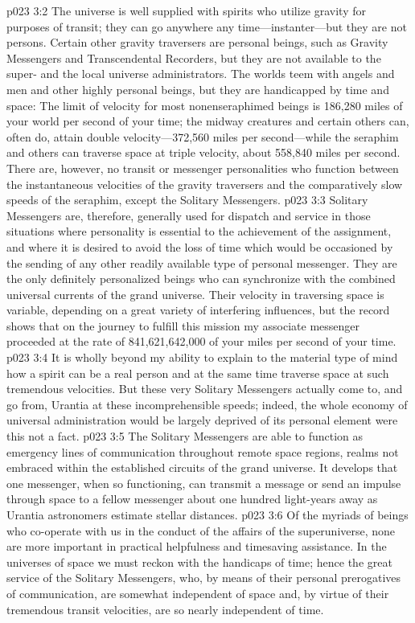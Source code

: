 \pc \vs p023 3:2 The universe is well supplied with spirits who utilize gravity for purposes of transit; they can go anywhere any time---instanter---but they are not persons. Certain other gravity traversers are personal beings, such as Gravity Messengers and Transcendental Recorders, but they are not available to the super\hyp{} and the local universe administrators. The worlds teem with angels and men and other highly personal beings, but they are handicapped by time and space: The limit of velocity for most nonenseraphimed beings is 186,280 miles of your world per second of your time; the midway creatures and certain others can, often do, attain double velocity---372,560 miles per second---while the seraphim and others can traverse space at triple velocity, about 558,840 miles per second. There are, however, no transit or messenger personalities who function between the instantaneous velocities of the gravity traversers and the comparatively slow speeds of the seraphim, except the Solitary Messengers.
\vs p023 3:3 Solitary Messengers are, therefore, generally used for dispatch and service in those situations where personality is essential to the achievement of the assignment, and where it is desired to avoid the loss of time which would be occasioned by the sending of any other readily available type of personal messenger. They are the only definitely personalized beings who can synchronize with the combined universal currents of the grand universe. Their velocity in traversing space is variable, depending on a great variety of interfering influences, but the record shows that on the journey to fulfill this mission my associate messenger proceeded at the rate of 841,621,642,000 of your miles per second of your time.
\vs p023 3:4 It is wholly beyond my ability to explain to the material type of mind how a spirit can be a real person and at the same time traverse space at such tremendous velocities. But these very Solitary Messengers actually come to, and go from, Urantia at these incomprehensible speeds; indeed, the whole economy of universal administration would be largely deprived of its personal element were this not a fact.
\pc \vs p023 3:5 The Solitary Messengers are able to function as emergency lines of communication throughout remote space regions, realms not embraced within the established circuits of the grand universe. It develops that one messenger, when so functioning, can transmit a message or send an impulse through space to a fellow messenger about one hundred light\hyp{}years away as Urantia astronomers estimate stellar distances.
\vs p023 3:6 Of the myriads of beings who co\hyp{}operate with us in the conduct of the affairs of the superuniverse, none are more important in practical helpfulness and timesaving assistance. In the universes of space we must reckon with the handicaps of time; hence the great service of the Solitary Messengers, who, by means of their personal prerogatives of communication, are somewhat independent of space and, by virtue of their tremendous transit velocities, are so nearly independent of time.
